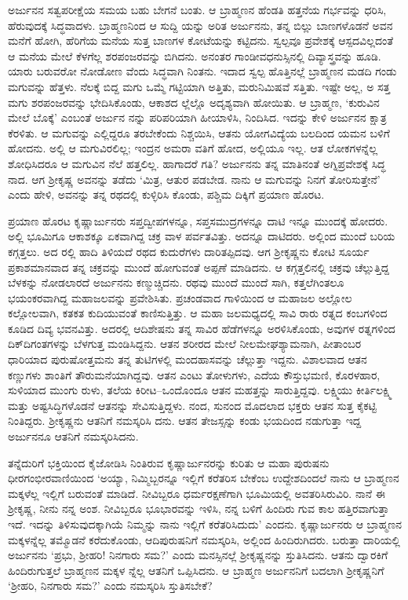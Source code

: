 ಅರ್ಜುನನ ಸತ್ವಪರೀಕ್ಷೆಯ ಸಮಯ ಬಹು ಬೇಗನೆ ಬಂತು. ಆ ಬ್ರಾಹ್ಮಣನ ಹೆಂಡತಿ ಹತ್ತನೆಯ ಗರ್ಭವನ್ನು ಧರಿಸಿ, ಹೆರುವುದಕ್ಕೆ ಸಿದ್ಧವಾದಳು. ಬ್ರಾಹ್ಮಣನಿಂದ ಆ ಸುದ್ದಿ ಯನ್ನು ಅರಿತ ಅರ್ಜುನನು, ತನ್ನ ಬಿಲ್ಲು ಬಾಣಗಳೊಡನೆ ಅವನ ಮನೆಗೆ ಹೋಗಿ, ಹೆರಿಗೆಯ ಮನೆಯ ಸುತ್ತ ಬಾಣಗಳ ಕೋಟೆಯನ್ನು ಕಟ್ಟಿದನು. ಸ್ವಲ್ಪವೂ ಪ್ರವೇಶಕ್ಕೆ ಆಸ್ಪದವಿಲ್ಲದಂತೆ ಆ ಮನೆಯ ಮೇಲೆ ಕೆಳಗೆಲ್ಲ ಶರಪಂಜರವನ್ನು ಬಿಗಿದನು. ಅನಂತರ ಗಾಂಡೀವಧನುಸ್ಸಿನಲ್ಲಿ ದಿವ್ಯಾಸ್ತ್ರವನ್ನು ಹೂಡಿ. ಯಾರು ಬರುವರೋ ನೋಡೋಣ ವೆಂದು ಸಿದ್ಧವಾಗಿ ನಿಂತನು. ಇದಾದ ಸ್ವಲ್ಪ ಹೊತ್ತಿನಲ್ಲೆ ಬ್ರಾಹ್ಮಣನ ಮಡದಿ ಗಂಡು ಮಗುವನ್ನು ಹೆತ್ತಳು. ನೆಲಕ್ಕೆ ಬಿದ್ದ ಮಗು ಒಮ್ಮೆ ಗಟ್ಟಿಯಾಗಿ ಅತ್ತಿತು, ಮರುನಿಮಿಷವೆ ಸತ್ತಿತು. ಇಷ್ಟೇ ಅಲ್ಲ, ಅ ಸತ್ತ ಮಗು ಶರಪಂಜರವನ್ನು ಭೇದಿಸಿಕೊಂಡು, ಆಕಾಶದ ಲ್ಲೆಲ್ಲೊ ಅದೃಶ್ಯವಾಗಿ ಹೋಯಿತು. ಆ ಬ್ರಾಹ್ಮಣ, ‘ಕುರುವಿನ ಮೇಲೆ ಬೊಕ್ಕೆ’ ಎಂಬಂತೆ ಅರ್ಜುನ ನನ್ನು ಪರಿಪರಿಯಾಗಿ ಹೀಯಾಳಿಸಿ, ನಿಂದಿಸಿದ. ಇದನ್ನು ಕೇಳಿ ಅರ್ಜುನನ ಕ್ಷಾತ್ರ ಕೆರಳಿತು. ಆ ಮಗುವನ್ನು ಎಲ್ಲಿದ್ದರೂ ತರಬೇಕೆಂದು ನಿಶ್ಚಯಿಸಿ, ಆತನು ಯೋಗವಿದ್ಯೆಯ ಬಲದಿಂದ ಯಮನ ಬಳಿಗೆ ಹೋದನು. ಅಲ್ಲಿ ಆ ಮಗುವಿರಲಿಲ್ಲ; ಇಂದ್ರನ ಅಮರಾ ವತಿಗೆ ಹೋದ, ಅಲ್ಲಿಯೂ ಇಲ್ಲ. ಆತ ಲೋಕಗಳನ್ನೆಲ್ಲ ಶೋಧಿಸಿದರೂ ಆ ಮಗುವಿನ ನೆಲೆ ಹತ್ತಲಿಲ್ಲ. ಹಾಗಾದರೆ ಗತಿ? ಅರ್ಜುನನು ತನ್ನ ಮಾತಿನಂತೆ ಅಗ್ನಿಪ್ರವೇಶಕ್ಕೆ ಸಿದ್ಧ ನಾದ. ಆಗ ಶ್ರೀಕೃಷ್ಣ ಅವನನ್ನು ತಡೆದು ‘ಮಿತ್ರ, ಆತುರ ಪಡಬೇಡ. ನಾನು ಆ ಮಗುವನ್ನು ನಿನಗೆ ತೋರಿಸುತ್ತೇನೆ’ ಎಂದು ಹೇಳಿ, ಅವನನ್ನು ತನ್ನ ರಥದಲ್ಲಿ ಕುಳ್ಳಿರಿಸಿ ಕೊಂಡು, ಪಶ್ಚಿಮ ದಿಕ್ಕಿಗೆ ಪ್ರಯಾಣ ಹೊರಟ.

ಪ್ರಯಾಣ ಹೊರಟ ಕೃಷ್ಣಾರ್ಜುನರು ಸಪ್ತದ್ವೀಪಗಳನ್ನೂ, ಸಪ್ತಸಮುದ್ರಗಳನ್ನೂ ದಾಟಿ ಇನ್ನೂ ಮುಂದಕ್ಕೆ ಹೋದರು. ಅಲ್ಲಿ ಭೂಮಿಗೂ ಆಕಾಶಕ್ಕೂ ಏಕವಾಗಿದ್ದ ಚಕ್ರ ವಾಳ ಪರ್ವತವಿತ್ತು. ಅದನ್ನೂ ದಾಟಿದರು. ಅಲ್ಲಿಂದ ಮುಂದೆ ಬರಿಯ ಕಗ್ಗತ್ತಲು. ಅದ ರಲ್ಲಿ ಹಾದಿ ತಿಳಿಯದೆ ರಥದ ಕುದುರೆಗಳು ದಾರಿತಪ್ಪಿದವು. ಆಗ ಶ್ರೀಕೃಷ್ಣನು ಕೋಟಿ ಸೂರ್ಯ ಪ್ರಕಾಶಮಾನವಾದ ತನ್ನ ಚಕ್ರವನ್ನು ಮುಂದೆ ಹೋಗುವಂತೆ ಅಪ್ಪಣೆ ಮಾಡಿದನು. ಆ ಕಗ್ಗತ್ತಲಿನಲ್ಲಿ ಚಕ್ರವು ಚೆಲ್ಲುತ್ತಿದ್ದ ಬೆಳಕನ್ನು ನೋಡಲಾರದೆ ಅರ್ಜುನನು ಕಣ್ಮುಚ್ಚಿದನು. ರಥವು ಮುಂದೆ ಮುಂದೆ ಸಾಗಿ, ಕತ್ತಲೆಗಿಂತಲೂ ಭಯಂಕರವಾಗಿದ್ದ ಮಹಾಜಲವನ್ನು ಪ್ರವೇಶಿಸಿತು. ಪ್ರಚಂಡವಾದ ಗಾಳಿಯಿಂದ ಆ ಮಹಾಜಲ ಅಲ್ಲೋಲ ಕಲ್ಲೋಲವಾಗಿ, ಕತಕತ ಕುದಿಯುವಂತೆ ಕಾಣಿಸುತ್ತಿತ್ತು. ಆ ಮಹಾ ಜಲಮಧ್ಯದಲ್ಲಿ ಸಾವಿ ರಾರು ರತ್ನದ ಕಂಬಗಳಿಂದ ಕೂಡಿದ ದಿವ್ಯ ಭವನವಿತ್ತು. ಅದರಲ್ಲಿ ಆದಿಶೇಷನು ತನ್ನ ಸಾವಿರ ಹೆಡೆಗಳನ್ನೂ ಅರಳಿಸಿಕೊಂಡು, ಅವುಗಳ ರತ್ನಗಳಿಂದ ದಿಕ್​ದಿಗಂತಗಳನ್ನು ಬೆಳಗುತ್ತ ಮಂಡಿಸಿದ್ದನು. ಆತನ ಶರೀರದ ಮೇಲೆ ನೀಲಮೇಘಶ್ಯಾಮನಾಗಿ, ಪೀತಾಂಬರ ಧಾರಿಯಾದ ಪುರುಷೋತ್ತಮನು ತನ್ನ ತುಟಿಗಳಲ್ಲಿ ಮಂದಹಾಸವನ್ನು ಚೆಲ್ಲುತ್ತಾ ಇದ್ದನು. ವಿಶಾಲವಾದ ಆತನ ಕಣ್ಣುಗಳು ಶಾಂತಿಗೆ ತೌರುಮನೆಯಾಗಿದ್ದವು. ಆತನ ಎಂಟು ತೋಳುಗಳು, ಎದೆಯ ಕೌಸ್ತುಭಮಣಿ, ಕೊರಳಹಾರ, ಸುಳಿಯಾದ ಮುಂಗು ರುಳು, ತಲೆಯ ಕಿರೀಟ–ಒಂದೊಂದೂ ಆತನ ಮಹತ್ತನ್ನು ಸಾರುತ್ತಿದ್ದವು. ಲಕ್ಷ್ಮಿಯು ಕೀರ್ತಿಲಕ್ಷ್ಮಿ ಮತ್ತು ಅಷ್ಟಸಿದ್ಧಿಗಳೊಡನೆ ಆತನನ್ನು ಸೇವಿಸುತ್ತಿದ್ದಳು. ನಂದ, ಸುನಂದ ಮೊದಲಾದ ಭಕ್ತರು ಆತನ ಸುತ್ತ ಕೈಕಟ್ಟಿ ನಿಂತಿದ್ದರು. ಶ್ರೀಕೃಷ್ಣನು ಆತನಿಗೆ ನಮಸ್ಕರಿಸಿ ದನು. ಆತನ ತೇಜಸ್ಸನ್ನು ಕಂಡು ಭಯದಿಂದ ನಡುಗುತ್ತಾ ಇದ್ದ ಅರ್ಜುನನೂ ಆತನಿಗೆ ನಮಸ್ಕರಿಸಿದನು.

ತನ್ನೆದುರಿಗೆ ಭಕ್ತಿಯಿಂದ ಕೈಜೋಡಿಸಿ ನಿಂತಿರುವ ಕೃಷ್ಣಾರ್ಜುನರನ್ನು ಕುರಿತು ಆ ಮಹಾ ಪುರುಷನು ಧೀರಗಂಭೀರವಾಣಿಯಿಂದ ‘ಅಯ್ಯಾ, ನಿಮ್ಮಿಬ್ಬರನ್ನೂ ಇಲ್ಲಿಗೆ ಕರೆತರಿಸ ಬೇಕೆಂಬ ಉದ್ದೇಶದಿಂದಲೆ ನಾನು ಆ ಬ್ರಾಹ್ಮಣನ ಮಕ್ಕಳೆಲ್ಲ ಇಲ್ಲಿಗೆ ಬರುವಂತೆ ಮಾಡಿದೆ. ನೀವಿಬ್ಬರೂ ಧರ್ಮರಕ್ಷಣೆಗಾಗಿ ಭೂಮಿಯಲ್ಲಿ ಅವತರಿಸಿರುವಿರಿ. ನಾನೆ ಈ ಶ್ರೀಕೃಷ್ಣ, ನೀನು ನನ್ನ ಅಂಶ. ನೀವಿಬ್ಬರೂ ಭೂಭಾರವನ್ನು ಇಳಿಸಿ, ನನ್ನ ಬಳಿಗೆ ಹಿಂದಿರು ಗುವ ಕಾಲ ಹತ್ತಿರವಾಗುತ್ತಾ ಇದೆ. ಇದನ್ನು ತಿಳಿಸುವುದಕ್ಕಾಗಿಯೆ ನಿಮ್ಮನ್ನು ನಾನು ಇಲ್ಲಿಗೆ ಕರೆತರಿಸಿದುದು’ ಎಂದನು. ಕೃಷ್ಣಾರ್ಜುನರು ಆ ಬ್ರಾಹ್ಮಣನ ಮಕ್ಕಳನ್ನೆಲ್ಲ ತಮ್ಮೊಡನೆ ಕರೆದುಕೊಂಡು, ಆದಿಪುರುಷನಿಗೆ ನಮಸ್ಕರಿಸಿ, ಅಲ್ಲಿಂದ ಹಿಂದಿರುಗಿದರು. ಬರುತ್ತಾ ದಾರಿಯಲ್ಲಿ ಅರ್ಜುನನು ‘ಪ್ರಭು, ಶ್ರೀಹರಿ! ನಿನಗಾರು ಸಮ?’ ಎಂದು ಮನಸ್ಸಿನಲ್ಲೆ ಶ್ರೀಕೃಷ್ಣನನ್ನು ಸ್ತುತಿಸಿದನು. ಆತನು ದ್ವಾರಕಿಗೆ ಹಿಂದಿರುಗುತ್ತಲೆ ಬ್ರಾಹ್ಮಣನ ಮಕ್ಕಳ ನ್ನೆಲ್ಲ ಆತನಿಗೆ ಒಪ್ಪಿಸಿದನು. ಆ ಬ್ರಾಹ್ಮಣ ಅರ್ಜುನನಿಗೆ ಬದಲಾಗಿ ಶ್ರೀಕೃಷ್ಣನಿಗೆ ‘ಶ್ರೀಹರಿ, ನಿನಗಾರು ಸಮ?’ ಎಂದು ನಮಸ್ಕರಿಸಿ ಸ್ತುತಿಸಬೇಕೆ?

